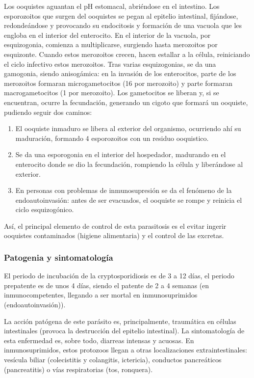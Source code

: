 Los ooquistes aguantan el pH estomacal, abriéndose en el intestino. Los esporozoitos que surgen del ooquistes se pegan al epitelio intestinal, fijándose, redondeándose y provocando su endocitosis y formación de una vacuola que les engloba en el interior del enterocito. En el interior de la vacuola, por esquizogonia, comienza a multiplicarse, surgiendo hasta merozoitos por esquizonte. Cuando estos merozoitos crecen, hacen estallar a la célula, reiniciando el ciclo infectivo estos merozoitos. Tras varias esquizogonias, se da una gamogonia, siendo anisogámica: en la invasión de los enterocitos, parte de los merozoitos formaran microgametocitos (16 por merozoito) y parte formaran macrogametocitos (1 por merozoito). Los gametocitos se liberan y, si se encuentran, ocurre la fecundación, generando un cigoto que formará un ooquiste, pudiendo seguir dos caminos:
\begin{enumerate}[itemsep=0pt,parsep=0pt,topsep=0pt,partopsep=0pt]
	\item El ooquiste inmaduro se libera al exterior del organismo, ocurriendo ahí su maduración, formando 4 esporozoitos con un residuo ooquistico.
	\item Se da una esporogonia en el interior del hospedador, madurando en el enterocito donde se dio la fecundación, rompiendo la célula y liberándose al exterior.
	\item En personas con problemas de inmunosupresión se da el fenómeno de la endoautoinvasión: antes de ser evacuados, el ooquiste se rompe y reinicia el ciclo esquizogónico.
\end{enumerate}

Así, el principal elemento de control de esta parasitosis es el evitar ingerir ooquistes contaminados (higiene alimentaria) y el control de las excretas.
\subsubsection{Patogenia y sintomatología}
El periodo de incubación de la cryptosporidiosis es de 3 a 12 días, el periodo prepatente es de unos 4 días, siendo el patente de 2 a 4 semanas (en inmunocompetentes, llegando a ser mortal en inmunosuprimidos (endoautoinvasión)).

La acción patógena de este parásito es, principalmente, traumática en células intestinales (provoca la destrucción del epitelio intestinal). La sintomatología de esta enfermedad es, sobre todo, diarreas intensas y acuosas. En inmunosuprimidos, estos protozoos llegan a otras localizaciones extraintestinales: vesícula biliar (colecistitis y colangitis, ictericia), conductos pancreáticos (pancreatitis) o vías respiratorias (tos, ronquera).
